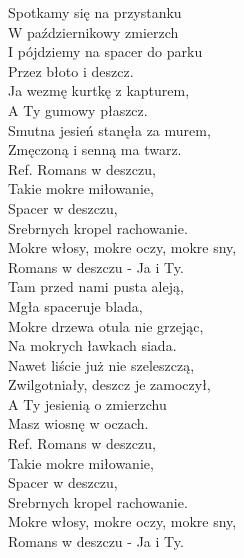 
\begin{flushleft}
Spotkamy się na przystanku\\
W październikowy zmierzch\\
I pójdziemy na spacer do parku\\
Przez błoto i deszcz.\\
Ja wezmę kurtkę z kapturem,\\
A Ty gumowy płaszcz.\\
Smutna jesień stanęła za murem,\\
Zmęczoną i senną ma twarz.\\
\vskip 3mm
Ref. Romans w deszczu,\\
\hspace{0.9cm}Takie mokre miłowanie,\\
\hspace{0.9cm}Spacer w deszczu,\\
\hspace{0.9cm}Srebrnych kropel rachowanie.\\
\hspace{0.9cm}Mokre włosy, mokre oczy, mokre sny,\\
\hspace{0.9cm}Romans w deszczu - Ja i Ty.        \\
\vskip 3mm
Tam przed nami pusta aleją,\\
Mgła spaceruje blada,\\
Mokre drzewa otula nie grzejąc,\\
Na mokrych ławkach siada.\\
Nawet liście już nie szeleszczą,\\
Zwilgotniały, deszcz je zamoczył,\\
A Ty jesienią o zmierzchu\\
Masz wiosnę w oczach.\\
\vskip 3mm
Ref. Romans w deszczu,\\
\hspace{0.9cm}Takie mokre miłowanie,\\
\hspace{0.9cm}Spacer w deszczu,\\
\hspace{0.9cm}Srebrnych kropel rachowanie.\\
\hspace{0.9cm}Mokre włosy, mokre oczy, mokre sny,\\
\hspace{0.9cm}Romans w deszczu - Ja i Ty.        \\
\end{flushleft}
\clearpage